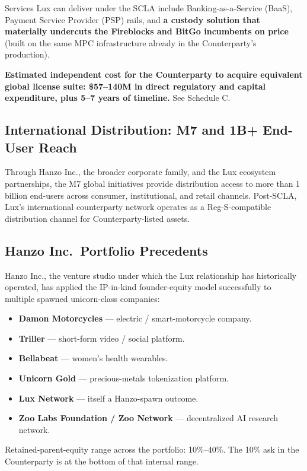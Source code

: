\documentclass[11pt,letterpaper]{article}
\begin{document}
Services Lux can deliver under the SCLA include Banking-as-a-Service
(BaaS), Payment Service Provider (PSP) rails, and \textbf{a custody
solution that materially undercuts the Fireblocks and BitGo
incumbents on price} (built on the same MPC infrastructure already
in the Counterparty's production).

\textbf{Estimated independent cost for the Counterparty to acquire
equivalent global license suite: \$57--140M in direct regulatory
and capital expenditure, plus 5--7 years of timeline.} See Schedule
C.

\subsection*{International Distribution: M7 and 1B+ End-User Reach}

Through Hanzo Inc., the broader corporate family, and the Lux
ecosystem partnerships, the M7 global initiatives provide
distribution access to more than 1 billion end-users across consumer,
institutional, and retail channels. Post-SCLA, Lux's international
counterparty network operates as a Reg-S-compatible distribution
channel for Counterparty-listed assets.

\subsection*{Hanzo Inc.\ Portfolio Precedents}

Hanzo Inc., the venture studio under which the Lux relationship has
historically operated, has applied the IP-in-kind founder-equity
model successfully to multiple spawned unicorn-class companies:

\begin{itemize}[leftmargin=1.5em,itemsep=0.1em]
\item \textbf{Damon Motorcycles} --- electric / smart-motorcycle company.
\item \textbf{Triller} --- short-form video / social platform.
\item \textbf{Bellabeat} --- women's health wearables.
\item \textbf{Unicorn Gold} --- precious-metals tokenization platform.
\item \textbf{Lux Network} --- itself a Hanzo-spawn outcome.
\item \textbf{Zoo Labs Foundation / Zoo Network} --- decentralized AI
research network.
\end{itemize}

Retained-parent-equity range across the portfolio: 10\%--40\%. The
10\% ask in the Counterparty is at the bottom of that internal range.
\end{document}
